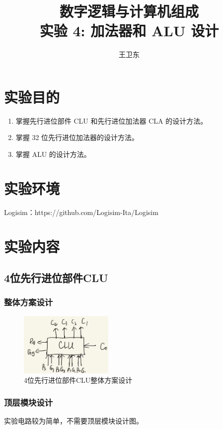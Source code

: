 \documentclass{article}
\title{数字逻辑与计算机组成\\ {\small 实验 4: 加法器和 ALU 设计}}
\author{王卫东\quad 221900332}
\date{\zhtoday}
\begin{document}
    \maketitle

    \section{实验目的}

    \begin{enumerate}
        \item 掌握先行进位部件 CLU 和先行进位加法器 CLA 的设计方法。
        \item 掌握 32 位先行进位加法器的设计方法。
        \item 掌握 ALU 的设计方法。
    \end{enumerate}
    \section{实验环境}

    Logisim：https://github.com/Logisim-Ita/Logisim

    \section{实验内容}
    
    \subsection{4位先行进位部件CLU}

    \subsubsection{整体方案设计}
    \begin{figure}[H]
    \centering
    \includegraphics[width=0.4\textwidth]{1.1.png}
    \caption{4位先行进位部件CLU整体方案设计}
    \end{figure}

    \subsubsection{顶层模块设计}
    实验电路较为简单，不需要顶层模块设计图。
\end{document}
